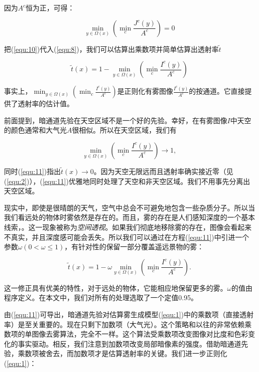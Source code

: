 \documentclass{ctexart}
\begin{document}
因为$A^c$恒为正，可得：

\begin{equation}\label{equ:10}
	\min_{y \in \Omega(x)} (\min_c \frac{J^c(y)}{A^c}) = 0
\end{equation}

把(\ref{equ:10})代入(\ref{equ:8})，我们可以估算出乘数项并简单估算出透射率$\tilde{t}$

\begin{equation}\label{equ:11}
	\tilde{t}(x) = 1 - \min_{y \in \Omega(x)} (\min_c \frac{I^c(y)}{A^c})
\end{equation}

事实上，$\min_{y \in \Omega(x)} (\min_c \frac{I^c(y)}{A^c})$是正则化有雾图像$\frac{I^c(y)}{A^c}$的按通道。它直接提供了透射率的估计值。\par

前面提到，暗通道先验在天空区域不是一个好的先验。幸好，在有雾图像$I$中天空的颜色通常和大气光$A$很相似。所以在天空区域，我们有

\[\min_{y \in \Omega(x)} (\min_c \frac{I^c(y)}{A^c}) \to 1,\]

同时(\ref{equ:11})指出$\tilde{t}(x) \to 0$。因为天空无限远而且透射率确实接近零（见(\ref{equ:2})），(\ref{equ:11})优雅地同时处理了天空和非天空区域。我们不用事先分离出天空区域。\par

现实中，即使是很晴朗的天气，空气中总会不可避免地包含一些杂质分子。所以当我们看远处的物体时雾依然是存在的。而且，雾的存在是人们感知深度的一个基本线索\cite{Goldstein1980}，\cite{PreethamShirleySmits1999}。这一现象被称为\emph{空间透视}。如果我们彻底地移除雾的存在，图像会看起来不真实，并且深度感可能会丢失。所以我们可以通过在方程(\ref{equ:11})中引进一个参数$\omega (0 < \omega \le 1)$，有针对性的保留一部分覆盖遥远景物的雾：

\begin{equation}\label{equ:12}
	\tilde{t}(x) = 1 - \omega\min_{y \in \Omega(x)} (\min_c \frac{I^c(y)}{A^c}).
\end{equation}

这一修正具有优美的特性，对于远处的物体，它能相应地保留更多的雾。$\omega$的值由程序定义。在本文中，我们对所有的处理选取了一个定值0.95。\par

由(\ref{equ:11})可导出，暗通道先验对估算雾生成模型(\ref{equ:1})中的乘数项（直接透射率）是至关重要的。现在只剩下加数项（大气光）。这个策略和以往的非常依赖乘数项的单图像去雾算法\cite{Fattal2008}，\cite{Tan2008}完全不一样。这个算法受乘数项改变图像对比度\cite{Tan2008}和色彩变化\cite{Fattal2008}的事实驱动。相反，我们注意到加数项改变局部暗像素的强度。借助暗通道先验，乘数项被舍去，而加数项才是估算透射率的关键。我们进一步正则化(\ref{equ:1})：
\end{document}
